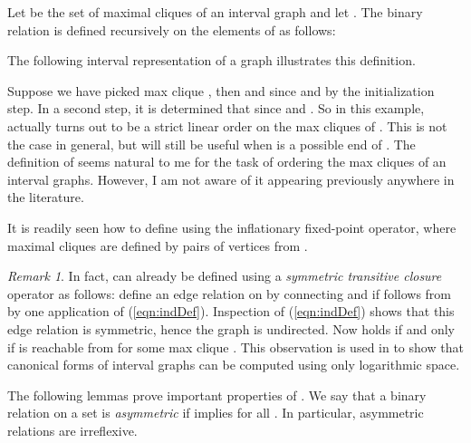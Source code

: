 \documentclass[10pt]{article}
\theoremstyle{remark}
\newtheorem{remark}[thm]{Remark}
\theoremstyle{definition}
\theoremstyle{plain}
\begin{document}
Let  be the set of maximal cliques of an interval graph  and let . The binary relation  is defined recursively on the elements of  as follows:


The following interval representation of a graph  illustrates this definition.

\begin{center}
\end{center}

Suppose we have picked max clique , then  and  since  and  by the initialization step. In a second step, it is determined that  since  and . So in this example,  actually turns out to be a strict linear order on the max cliques of . This is not the case in general, but  will still be useful when  is a possible end of . The definition of  seems natural to me for the task of ordering the max cliques of an interval graphs. However, I am not aware of it appearing previously anywhere in the literature.

It is readily seen how to define  using the inflationary fixed-point operator, where maximal cliques are defined by pairs of vertices from .

\begin{remark} \label{rem:alreadySTC}
 In fact,  can already be defined using a \emph{symmetric transitive closure} operator as follows: define an edge relation on  by connecting  and  if  follows from  by one application of (\ref{eqn:indDef}). Inspection of (\ref{eqn:indDef}) shows that this edge relation is symmetric, hence the graph is undirected. Now  holds if and only if  is reachable from  for some max clique . This observation is used in \cite{koebler10interval} to show that canonical forms of interval graphs can be computed using only logarithmic space.
\end{remark}


The following lemmas prove important properties of . We say that a binary relation  on a set  is \emph{asymmetric} if  implies  for all . In particular, asymmetric relations are irreflexive.
\end{document}

